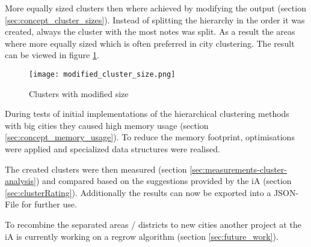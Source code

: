 More equally sized clusters then where achieved by modifying the output (section \ref{sec:concept_cluster_sizes}). Instead of splitting the hierarchy in the order it was created, always the cluster with the most notes was split. As a result the areas where more equally sized which is often preferred in city clustering. The result can be viewed in figure  \ref{fig:cluster_with_mod_sizes}.

\begin{figure}[ht]
    \centering
    \begin{mdframed}[style=mdthight, userdefinedwidth=0.4\linewidth, align=center]
        \texttt{[image: modified\_cluster\_size.png]}
    \end{mdframed}
    \caption{Clusters with modified size}
    \label{fig:cluster_with_mod_sizes}
\end{figure}

During tests of initial implementations of the hierarchical clustering methods with big cities they caused high memory usage (section \ref{sec:concept_memory_usage}). To reduce the memory footprint, optimisations were applied and specialized data structures were realised.

The created clusters were then measured (section \ref{sec:measurements-cluster-analysis}) and compared based on the suggestions provided by the \gls{iA} (section \ref{sec:clusterRating}). Additionally the results can now be exported into a JSON-File for further use.

To recombine the separated areas / districts to new cities another project at the \gls{iA} is currently working on a regrow algorithm (section \ref{sec:future_work}).